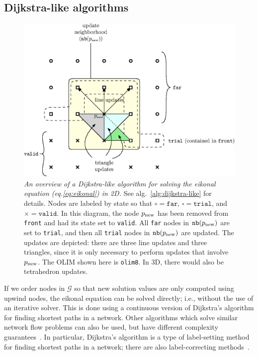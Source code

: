 \documentclass[smallcondensed]{svjour3}
\begin{document}
\subsection{Dijkstra-like algorithms}\label{ssec:dijkstra-like}

\begin{figure}[t]
  \centering
  \includegraphics[width=0.9\linewidth]{overview-2.eps}
  \caption{\emph{An overview of a Dijkstra-like algorithm for solving
      the eikonal equation (eq.\@ \ref{eq:eikonal}) in 2D.} See alg.\
    \ref{alg:dijkstra-like} for details. Nodes are labeled by state so
    that $\circ = \mathtt{far}$, $\square = \mathtt{trial}$, and
    $\times = \mathtt{valid}$. In this diagram, the node $p_{\operatorname{new}}$ has
    been removed from \texttt{front} and had its state set to
    \texttt{valid}. All \texttt{far} nodes in $\texttt{nb}(p_{\operatorname{new}})$ are set
    to \texttt{trial}, and then all \texttt{trial} nodes in
    $\texttt{nb}(p_{\operatorname{new}})$ are updated. The updates are depicted: there are
    three line updates and three triangles, since it is only necessary
    to perform updates that involve $p_{\operatorname{new}}$. The OLIM shown here is
    \texttt{olim8}. In 3D, there would also be tetrahedron updates.}
  \label{fig:overview}
\end{figure}

If we order nodes in $\mathcal{G}$ so that new solution values are
only computed using upwind nodes, the eikonal equation can be solved
directly; i.e., without the use of an iterative solver. This is done
using a continuous version of Dijkstra's algorithm for finding
shortest paths in a network. Other algorithms which solve similar
network flow problems can also be used, but have different complexity
guarantees~\cite{chacon2012fast}. In particular, Dijkstra's algorithm
is a type of label-setting method for finding shortest paths in a
network; there are also label-correcting
methods~\cite{bertsekas1998network}.
\end{document}
